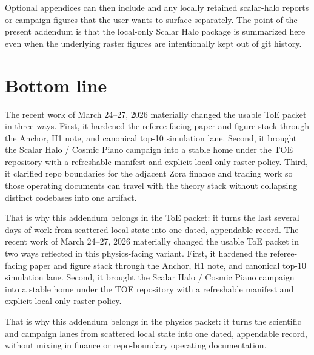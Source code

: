Optional appendices can then include  and any locally retained scalar-halo reports or campaign figures that the user wants to surface separately. The point of the present addendum is that the local-only Scalar Halo package is summarized here even when the underlying raster figures are intentionally kept out of git history.

\section{Bottom line}
\ifIncludeRepoBoundary
The recent work of March 24--27, 2026 materially changed the usable ToE packet in three ways. First, it hardened the referee-facing paper and figure stack through the Anchor, H1 note, and canonical top-10 simulation lane. Second, it brought the Scalar Halo / Cosmic Piano campaign into a stable home under the TOE repository with a refreshable manifest and explicit local-only raster policy. Third, it clarified repo boundaries for the adjacent Zora finance and trading work so those operating documents can travel with the theory stack without collapsing distinct codebases into one artifact.

That is why this addendum belongs in the ToE packet: it turns the last several days of work from scattered local state into one dated, appendable record.
\else
The recent work of March 24--27, 2026 materially changed the usable ToE packet in two ways reflected in this physics-facing variant. First, it hardened the referee-facing paper and figure stack through the Anchor, H1 note, and canonical top-10 simulation lane. Second, it brought the Scalar Halo / Cosmic Piano campaign into a stable home under the TOE repository with a refreshable manifest and explicit local-only raster policy.

That is why this addendum belongs in the physics packet: it turns the scientific and campaign lanes from scattered local state into one dated, appendable record, without mixing in finance or repo-boundary operating documentation.
\fi
